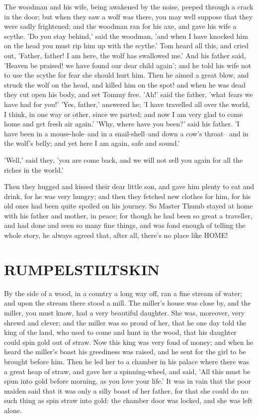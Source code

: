 \documentclass[12pt]{book}
\begin{document}
The woodman and his wife, being awakened by the noise, peeped through
a crack in the door; but when they saw a wolf was there, you may well
suppose that they were sadly frightened; and the woodman ran for his
axe, and gave his wife a scythe. 'Do you stay behind,' said the
woodman, 'and when I have knocked him on the head you must rip him up
with the scythe.' Tom heard all this, and cried out, 'Father, father!
I am here, the wolf has swallowed me.' And his father said, 'Heaven be
praised! we have found our dear child again'; and he told his wife not
to use the scythe for fear she should hurt him. Then he aimed a great
blow, and struck the wolf on the head, and killed him on the spot! and
when he was dead they cut open his body, and set Tommy free. 'Ah!'
said the father, 'what fears we have had for you!' 'Yes, father,'
answered he; 'I have travelled all over the world, I think, in one way
or other, since we parted; and now I am very glad to come home and get
fresh air again.' 'Why, where have you been?' said his father. 'I have
been in a mouse-hole--and in a snail-shell--and down a cow's throat--
and in the wolf's belly; and yet here I am again, safe and sound.'

'Well,' said they, 'you are come back, and we will not sell you again
for all the riches in the world.'

Then they hugged and kissed their dear little son, and gave him plenty
to eat and drink, for he was very hungry; and then they fetched new
clothes for him, for his old ones had been quite spoiled on his
journey. So Master Thumb stayed at home with his father and mother, in
peace; for though he had been so great a traveller, and had done and
seen so many fine things, and was fond enough of telling the whole
story, he always agreed that, after all, there's no place like HOME!



\chapter{RUMPELSTILTSKIN}

By the side of a wood, in a country a long way off, ran a fine stream
of water; and upon the stream there stood a mill. The miller's house
was close by, and the miller, you must know, had a very beautiful
daughter. She was, moreover, very shrewd and clever; and the miller
was so proud of her, that he one day told the king of the land, who
used to come and hunt in the wood, that his daughter could spin gold
out of straw. Now this king was very fond of money; and when he heard
the miller's boast his greediness was raised, and he sent for the girl
to be brought before him. Then he led her to a chamber in his palace
where there was a great heap of straw, and gave her a spinning-wheel,
and said, 'All this must be spun into gold before morning, as you love
your life.' It was in vain that the poor maiden said that it was only
a silly boast of her father, for that she could do no such thing as
spin straw into gold: the chamber door was locked, and she was left
alone.
\end{document}
